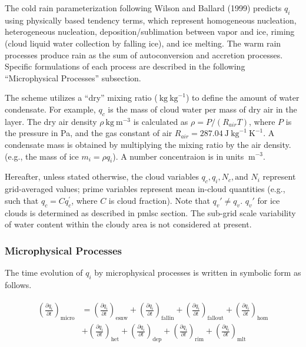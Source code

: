 The cold rain parameterization following Wilson and Ballard (1999)
predicts \(q_i\) using physically based tendency terms, which represent
homogeneous nucleation, heterogeneous nucleation, deposition/sublimation
between vapor and ice, riming (cloud liquid water collection by falling
ice), and ice melting. The warm rain processes produce rain as the sum
of autoconversion and accretion processes. Specific formulations of each
process are described in the following ``Microphysical Processes''
subsection.

The scheme utilizes a ``dry'' mixing ratio
(\(\mathrm{~kg} \mathrm{~kg}^{-1}\)) to define the amount of water
condensate. For example, \(q_c\) is the mass of cloud water per mass of
dry air in the layer. The dry air density
\(\rho \mathrm{~kg} \mathrm{~m}^{-3}\) is calculated as
\(\rho =P/(R_{air}T)\), where \(P\) is the pressure in Pa, and the gas
constant of air
\(R_{air} =287.04 \mathrm{~J} \mathrm{~kg}^{-1} \mathrm{~K}^{-1}\). A
condensate mass is obtained by multiplying the mixing ratio by the air
density. (e.g., the mass of ice \(m_i = \rho q_i\)). A number
concentraion is in units \(\mathrm{~m}^{-3}\).

Hereafter, unless stated otherwise, the cloud variables
\(q_c, q_i,N_c, \text{and } N_i\) represent grid-averaged values; prime
variables represent mean in-cloud quantities (e.g., such that
\(q_c = C q_c^{'}\), where \(C\) is cloud fraction). Note that
\(q_v{'} \neq q_v\). \(q_v{'}\) for ice clouds is determined as
described in pmlsc section. The sub-grid scale variability of water
content within the cloudy area is not considered at present.

\hypertarget{microphysical-processes}{%
\subsubsection{Microphysical Processes}\label{microphysical-processes}}

The time evolution of \(q_i\) by microphysical processes is written in
symbolic form as follows.

\begin{eqnarray}
\begin{split}
\left(\frac{\partial q_i}{\partial t}\right)_{\text {micro}}
&=\left(\frac{\partial q_i}{\partial t}\right)_{\text {esnw}}
+\left(\frac{\partial q_i}{\partial t}\right)_{\text {fallin}}
+\left(\frac{\partial q_i}{\partial t}\right)_{\text {fallout}}
+\left(\frac{\partial q_i}{\partial t}\right)_{\text {hom}}\\
&+\left(\frac{\partial q_i}{\partial t}\right)_{\text {het}}
+\left(\frac{\partial q_i}{\partial t}\right)_{\text {dep}}
+\left(\frac{\partial q_i}{\partial t}\right)_{\text {rim}}
+\left(\frac{\partial q_i}{\partial t}\right)_{\text {mlt}}
\end{split}
\end{eqnarray}

